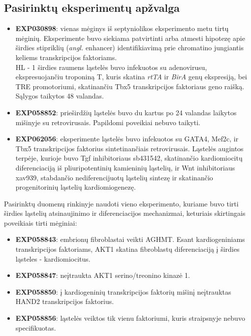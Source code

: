 \documentclass[12pt]{article}
\begin{document}
\subsection{Pasirinktų eksperimentų apžvalga}
\begin{itemize}
    \item \textbf{EXP030898}: vienas mėginys iš septyniolikos eksperimento
        metu tirtų mėginių. Eksperimente buvo siekiama patvirtinti arba
        atmesti hipotezę apie širdies stipriklių (\emph{angl.} enhancer)
        identifikiavimą prie chromatino jungiantis keliems transkripcijos
        faktoriams. \\
        HL - 1 širdies raumens ląstelės buvo infekuotos su adenovirusu,
        ekspresuojančiu troponiną T, kuris skatina \emph{rtTA} ir \emph{BirA}
        genų ekspresiją, bei TRE promotoriumi, skatinančiu Tbx5 transkripcijos
        faktoriaus geno raišką. Sąlygos taikytos 48 valandas.
    \item \textbf{EXP058852}: prieširdžių ląstelės buvo du kartus po 24
        valandas laikytos mišinyje su retrovirusais. Papildomi poveikiai nebuvo
        taikyti.
    \item \textbf{EXP062056}: eksperimente ląstelės buvo infekuotos su GATA4,
        Mef2c, ir Tbx5 transkripcijos faktorius sintetinančiais retrovirusais.
        Ląstelės augintos terpėje, kurioje buvo {Tgf\textbeta} inhibitoriaus
        sb431542, skatinančio kardiomiocitų diferenciaciją iš pliuripotentinių
        kamieninių ląstelių, ir Wnt inhibitoriaus xav939, stabdančio
        nediferencijuotų ląstelių sintezę ir skatinančio progenitorinių
        ląstelių kardiomiogenezę.
\end{itemize}

Pasirinktų duomenų rinkinyje naudoti vieno eksperimento, kuriame buvo tirti
širdies ląstelių atsinaujinimo ir diferenciacijos mechanizmai, keturiais
skirtingais poveikiais tirti mėginiai:

\begin{itemize}
    \item \textbf{EXP058843}: embrionų fibroblastai veikti AGHMT. Esant
        kardiogeniniams transkripcijos faktoriams, AKT1 skatina fibroblastų
        diferenciaciją į širdies ląsteles - kardiomiocitus.
    \item \textbf{EXP058847}: neįtraukta AKT1 serino/treonino kinazė 1.
    \item \textbf{EXP058850}: į kardiogeninių transkripcijos faktorių mišinį
        neįtrauktas HAND2 transkripcijos faktorius.
    \item \textbf{EXP058856}: ląstelės veiktos tik vienu faktoriumi, kuris
        straipsnyje nebuvo specifikuotas.
  \end{itemize}
\newpage
\end{document}
